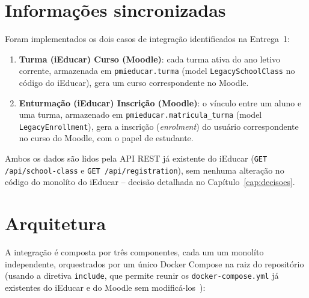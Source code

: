 \documentclass[
	12pt, openright, twoside, a4paper,
	english,
	brazil
	]{abntex2}
\begin{document}
\chapter{Informa\c{c}\~oes sincronizadas}

Foram implementados os dois casos de integra\c{c}\~ao identificados na Entrega~1:

\begin{enumerate}
  \item \textbf{Turma (iEducar) \textrightarrow{} Curso (Moodle)}: cada turma ativa do ano letivo
  corrente, armazenada em \texttt{pmieducar.turma} (model \texttt{LegacySchoolClass} no c\'odigo do
  iEducar), gera um curso correspondente no Moodle.
  \item \textbf{Enturma\c{c}\~ao (iEducar) \textrightarrow{} Inscri\c{c}\~ao (Moodle)}: o v\'inculo
  entre um aluno e uma turma, armazenado em \texttt{pmieducar.matricula\_turma} (model
  \texttt{LegacyEnrollment}), gera a inscri\c{c}\~ao (\emph{enrolment}) do usu\'ario correspondente
  no curso do Moodle, com o papel de estudante.
\end{enumerate}

Ambos os dados s\~ao lidos pela API REST j\'a existente do iEducar
(\texttt{GET /api/school-class} e \texttt{GET /api/registration}), sem nenhuma altera\c{c}\~ao no
c\'odigo do monol\'ito do iEducar -- decis\~ao detalhada no Cap\'itulo~\ref{cap:decisoes}.

\chapter{Arquitetura}

A integra\c{c}\~ao \'e composta por tr\^es componentes, cada um um monol\'ito independente,
orquestrados por um \'unico Docker Compose na raiz do reposit\'orio (usando a diretiva
\texttt{include}, que permite reunir os \texttt{docker-compose.yml} j\'a existentes do iEducar e do
Moodle sem modific\'a-los~\cite{docker-compose-include}):
\end{document}
